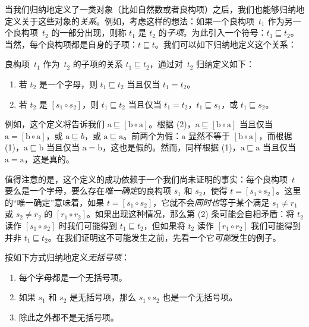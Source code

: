 \documentclass[../../../include/open-logic-section]{subfiles}
\begin{document}


当我们归纳地定义了一类对象（比如自然数或者良构项）之后，我们也能够归纳地定义关于这些对象的\emph{关系}。例如，考虑这样的想法：如果一个良构项~$t_1$ 作为另一个良构项~$t_2$ 的一部分出现，则称 $t_1$ 是 $t_2$ 的\textit{子项}。为此引入一个符号：$t_1 \sqsubseteq t_2$。当然，每个良构项都是自身的子项：$t \sqsubseteq t$。我们可以如下归纳地定义这个关系：

\begin{defn}
  良构项~$t_1$ 作为~$t_2$ 的子项的关系 $t_1 \sqsubseteq t_2$，通过对~$t_2$ 归纳定义如下：
  \begin{enumerate}
  \item 若 $t_2$ 是一个字母，则 $t_1 \sqsubseteq t_2$ 当且仅当 $t_1 = t_2$。
  \item 若 $t_2$ 是 $[s_1 \circ s_2]$，则 $t_1 \sqsubseteq t_2$ 当且仅当 $t_1 = t_2$，$t_1 \sqsubseteq s_1$，或 $t_1 \sqsubseteq s_2$。
  \end{enumerate}
\end{defn}

例如，这个定义将告诉我们 $\mathrm{a}
\sqsubseteq [\mathrm{b} \circ \mathrm{a}]$。根据 (2)，$\mathrm{a} \sqsubseteq [\mathrm{b} \circ \mathrm{a}]$ 当且仅当 $\mathrm{a}
= [\mathrm{b} \circ \mathrm{a}]$，或 $\mathrm{a} \sqsubseteq b$，或 $\mathrm{a} \sqsubseteq \mathrm{a}$。前两个为假：$\mathrm{a}$ 显然不等于 $[\mathrm{b} \circ
  \mathrm{a}]$，而根据 (1)，$\mathrm{a} \sqsubseteq \mathrm{b}$ 当且仅当 $\mathrm{a} = \mathrm{b}$，这也是假的。然而，同样根据 (1)，$\mathrm{a} \sqsubseteq \mathrm{a}$ 当且仅当 $\mathrm{a} = \mathrm{a}$，这是真的。

值得注意的是，这个定义的成功依赖于一个我们尚未证明的事实：每个良构项~$t$ 要么是一个字母，要么存在\emph{唯一确定}的良构项 $s_1$ 和 $s_2$，使得 $t = [s_1 \circ s_2]$。这里的“唯一确定”意味着，如果 $t = [s_1 \circ s_2]$，它就不会\emph{同时也}等于某个满足 $s_1 \neq r_1$ 或 $s_2 \neq r_2$ 的 $[r_1 \circ r_2]$。如果出现这种情况，那么第 (2) 条可能会自相矛盾：将 $t_2$ 读作 $[s_1 \circ s_2]$ 时我们可能得到 $t_1 \sqsubseteq t_2$，但如果将 $t_2$ 读作 $[r_1 \circ r_2]$ 我们可能得到并非 $t_1 \sqsubseteq t_2$。在我们证明这不可能发生之前，先看一个它\emph{可能}发生的例子。

\begin{defn}
  按如下方式归纳地定义\emph{无括号项}：
  \begin{enumerate}
  \item 每个字母都是一个无括号项。
    \item 如果 $s_1$ 和 $s_2$ 是无括号项，那么 $s_1 \circ s_2$ 也是一个无括号项。
    \item 除此之外都不是无括号项。
  \end{enumerate}
\end{defn}
\end{document}
